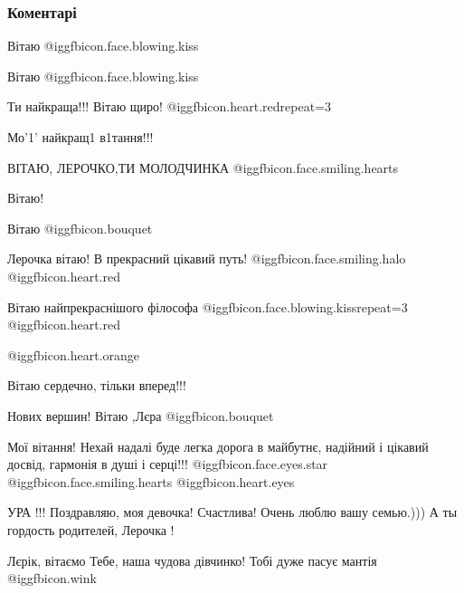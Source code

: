  
 
 
 
 
\subsubsection{Коментарі}
\label{sec:05_07_2021.fb.ivanchuk_valeria.1.vypusk_bakalavr_filosofia.cmt}

\begin{itemize} %
Вітаю @igg{fbicon.face.blowing.kiss} 

Вітаю @igg{fbicon.face.blowing.kiss} 

Ти найкраща!!! Вітаю щиро! @igg{fbicon.heart.red}{repeat=3}

Мо'1' найкращ1 в1тання!!!

ВІТАЮ, ЛЕРОЧКО,ТИ МОЛОДЧИНКА  @igg{fbicon.face.smiling.hearts} 

Вітаю!

Вітаю @igg{fbicon.bouquet} 

Лерочка вітаю! В прекрасний цікавий путь! @igg{fbicon.face.smiling.halo} @igg{fbicon.heart.red}

Вітаю найпрекраснішого філософа  @igg{fbicon.face.blowing.kiss}{repeat=3} @igg{fbicon.heart.red}

 @igg{fbicon.heart.orange} 

Вітаю сердечно, тільки вперед!!!

Нових вершин!
Вітаю ,Лєра @igg{fbicon.bouquet} 

Мої вітання! Нехай надалі буде легка дорога в майбутнє, надійний і цікавий досвід, гармонія в душі і серці!!! @igg{fbicon.face.eyes.star}  @igg{fbicon.face.smiling.hearts}  @igg{fbicon.heart.eyes} 

УРА !!! Поздравляю, моя девочка! Счастлива! Очень люблю вашу семью.))) А ты гордость родителей, Лерочка !

Лєрік, вітаємо Тебе, наша чудова дівчинко!
Тобі дуже пасує мантія  @igg{fbicon.wink} 


\end{itemize}
